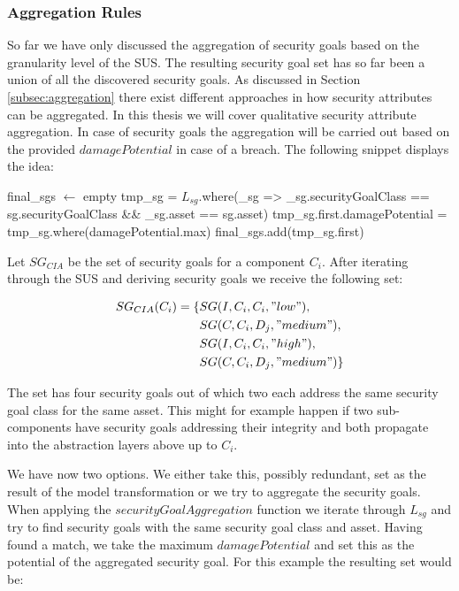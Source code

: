 \subsubsection{Aggregation Rules}

So far we have only discussed the aggregation of security goals based on the granularity level of the SUS. The resulting security goal set has so far been a union of all the discovered security goals. As discussed in Section \ref{subsec:aggregation} there exist different approaches in how security attributes can be aggregated. In this thesis we will cover qualitative security attribute aggregation. In case of security goals the aggregation will be carried out based on the provided $damagePotential$ in case of a breach. The following snippet displays the idea:

\begin{algorithm}[H] 
\begin{algorithmic}
\State final\_sgs $\gets$ empty
\State tmp\_sg = $L_{sg}$.where(\_sg => \_sg.securityGoalClass == sg.securityGoalClass  \&\& \_sg.asset == sg.asset)
\State tmp\_sg.first.damagePotential = tmp\_sg.where(damagePotential.max)
\State final\_sgs.add(tmp\_sg.first)
\EndFor
\EndFunction
\end{algorithmic}
\end{algorithm}

Let $SG_{CIA}$ be the set of security goals for a component $C_i$. After iterating through the SUS and deriving security goals we receive the following set:

\begin{align*}
SG_{CIA}(C_i) = \{&SG(I,C_i,C_i,"low"),\\ &SG(C,C_i,D_j, "medium"),\\ &SG(I,C_i,C_i,"high"),\\ &SG(C,C_i,D_j, "medium")\} \\
\end{align*}

The set has four security goals out of which two each address the same security goal class for the same asset. This might for example happen if two sub-components have security goals addressing their integrity and both propagate into the abstraction layers above up to $C_i$. 

We have now two options. We either take this, possibly redundant, set as the result of the model transformation or we try to aggregate the security goals. When applying the $securityGoalAggregation$ function we iterate through $L_{sg}$ and try to find security goals with the same security goal class and  asset. Having found a match, we take the maximum $damagePotential$ and set this as the potential of the aggregated security goal. For this example the resulting set would be:

